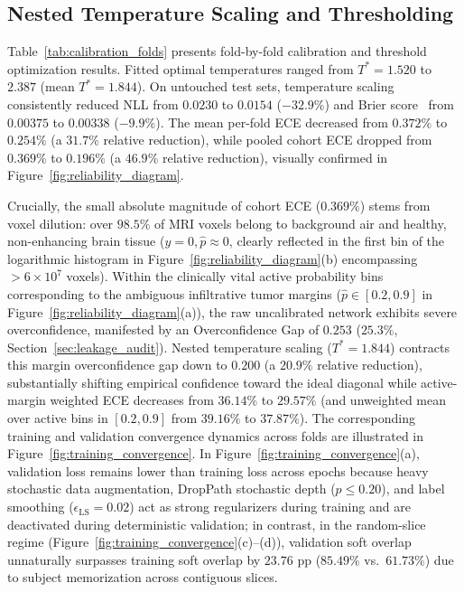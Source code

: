 \documentclass[11pt,a4paper]{article}
\begin{document}
\subsection{Nested Temperature Scaling and Thresholding}
\label{sec:calibration_results}
Table~\ref{tab:calibration_folds} presents fold-by-fold calibration and threshold optimization results. Fitted optimal temperatures ranged from $T^* = 1.520$ to $2.387$ (mean $T^* = 1.844$). On untouched test sets, temperature scaling consistently reduced NLL from $0.0230$ to $0.0154$ ($-32.9\%$) and Brier score~\cite{brier1950verification} from $0.00375$ to $0.00338$ ($-9.9\%$). The mean per-fold ECE decreased from $0.372\%$ to $0.254\%$ (a $31.7\%$ relative reduction), while pooled cohort ECE dropped from $0.369\%$ to $0.196\%$ (a $46.9\%$ relative reduction), visually confirmed in Figure~\ref{fig:reliability_diagram}.

Crucially, the small absolute magnitude of cohort ECE ($0.369\%$) stems from voxel dilution: over $98.5\%$ of MRI voxels belong to background air and healthy, non-enhancing brain tissue ($y=0, \hat{p} \approx 0$, clearly reflected in the first bin of the logarithmic histogram in Figure~\ref{fig:reliability_diagram}(b) encompassing $>6 \times 10^7$ voxels). Within the clinically vital active probability bins corresponding to the ambiguous infiltrative tumor margins ($\hat{p} \in [0.2, 0.9]$ in Figure~\ref{fig:reliability_diagram}(a)), the raw uncalibrated network exhibits severe overconfidence, manifested by an Overconfidence Gap of $0.253$ ($25.3\%$, Section~\ref{sec:leakage_audit}). Nested temperature scaling ($T^* = 1.844$) contracts this margin overconfidence gap down to $0.200$ (a $20.9\%$ relative reduction), substantially shifting empirical confidence toward the ideal diagonal while active-margin weighted ECE decreases from $36.14\%$ to $29.57\%$ (and unweighted mean over active bins in $[0.2, 0.9]$ from $39.16\%$ to $37.87\%$). The corresponding training and validation convergence dynamics across folds are illustrated in Figure~\ref{fig:training_convergence}. In Figure~\ref{fig:training_convergence}(a), validation loss remains lower than training loss across epochs because heavy stochastic data augmentation, DropPath stochastic depth ($p \le 0.20$), and label smoothing ($\epsilon_{\text{LS}} = 0.02$) act as strong regularizers during training and are deactivated during deterministic validation; in contrast, in the random-slice regime (Figure~\ref{fig:training_convergence}(c)--(d)), validation soft overlap unnaturally surpasses training soft overlap by $23.76\text{ pp}$ ($85.49\%$ vs.\ $61.73\%$) due to subject memorization across contiguous slices.
\end{document}
